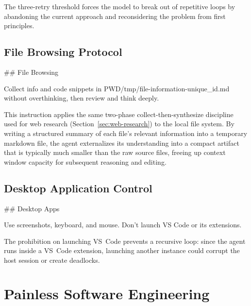 \documentclass{article}
\begin{document}
The three-retry threshold forces the model to break out of repetitive loops by abandoning the current approach and reconsidering the problem from first principles.

\subsection{File Browsing Protocol}
\label{app:file-browsing}

\begin{prompt}
## File Browsing

Collect info and code snippets in PWD/tmp/file-information-{unique_id}.md without overthinking, then review and think deeply.
\end{prompt}

This instruction applies the same two-phase collect-then-synthesize discipline used for web research (Section~\ref{sec:web-research}) to the local file system.  By writing a structured summary of each file's relevant information into a temporary markdown file, the agent externalizes its understanding into a compact artifact that is typically much smaller than the raw source files, freeing up context window capacity for subsequent reasoning and editing.

\subsection{Desktop Application Control}
\label{app:desktop}

\begin{prompt}
## Desktop Apps

Use screenshots, keyboard, and mouse. Don't launch VS Code or its extensions.
\end{prompt}

The prohibition on launching VS~Code prevents a recursive loop: since the agent runs inside a VS~Code extension, launching another instance could corrupt the host session or create deadlocks.

\section{Painless Software Engineering}
\label{app:painless}
\end{document}
